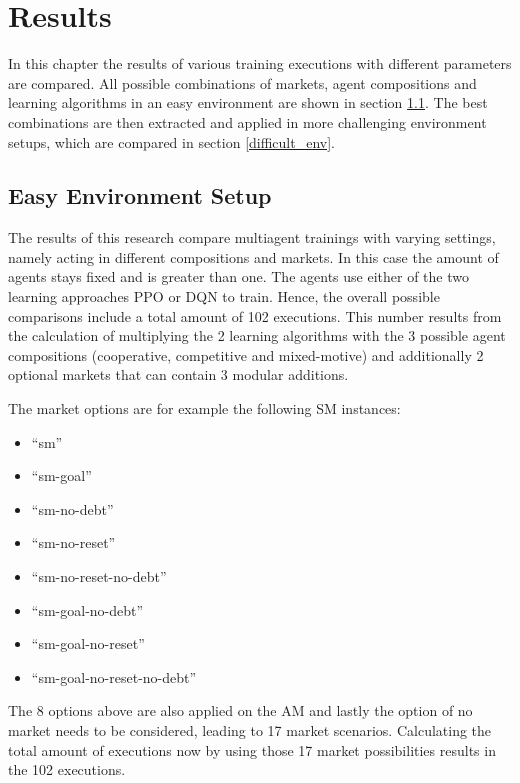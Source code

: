 %
%
\chapter{Results}\label{sec:Results}
In this chapter the results of various training executions with different parameters are compared. All possible combinations of markets, agent compositions and learning algorithms in an easy environment are shown in section \ref{easy_env}. The best combinations are then extracted and applied in more challenging environment setups, which are compared in section \ref{difficult_env}. 

\section{Easy Environment Setup} \label{easy_env}
The results of this research compare multiagent trainings with varying settings, namely acting in different compositions and markets. In this case the amount of agents stays fixed and is greater than one. The agents use either of the two learning approaches PPO or DQN to train. Hence, the overall possible comparisons include a total amount of 102 executions. This number results from the calculation of multiplying the 2 learning algorithms with the 3 possible agent compositions (cooperative, competitive and mixed-motive) and additionally 2 optional markets that can contain 3 modular additions. 

The market options are for example the following SM instances: 
\begin{itemize}
    \item ``sm''
    \item ``sm-goal''
    \item ``sm-no-debt''
    \item ``sm-no-reset''
    \item ``sm-no-reset-no-debt''
    \item ``sm-goal-no-debt''
    \item ``sm-goal-no-reset''
    \item ``sm-goal-no-reset-no-debt''
\end{itemize}
The 8 options above are also applied on the AM and lastly the option of no market needs to be considered, leading to 17 market scenarios. Calculating the total amount of executions now by using those 17 market possibilities results in the 102 executions.

